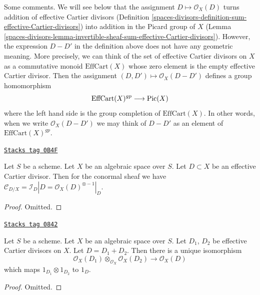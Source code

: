 Some comments. We will see below that the assignment
$D \mapsto \mathcal{O}_X(D)$ turns addition of effective Cartier
divisors (Definition \ref{spaces-divisors-definition-sum-effective-Cartier-divisors})
into addition in the Picard group of $X$
(Lemma \ref{spaces-divisors-lemma-invertible-sheaf-sum-effective-Cartier-divisors}).
However, the expression $D - D'$ in the definition above does not
have any geometric meaning. More precisely, we can think of the
set of effective Cartier divisors on $X$ as a commutative monoid
$\text{EffCart}(X)$ whose zero element is the empty effective Cartier divisor.
Then the assignment $(D, D') \mapsto \mathcal{O}_X(D - D')$ defines
a group homomorphism
$$
\text{EffCart}(X)^{gp} \longrightarrow \operatorname{Pic}(X)
$$
where the left hand side is the group completion of
$\text{EffCart}(X)$. In other words, when we write $\mathcal{O}_X(D - D')$
we may think of $D - D'$ as an element of $\text{EffCart}(X)^{gp}$.

\begin{lemma}
\label{spaces-divisors-lemma-conormal-effective-Cartier-divisor}
\href{https://stacks.math.columbia.edu/tag/0B4F}{\texttt{Stacks tag 0B4F}}

Let $S$ be a scheme. Let $X$ be an algebraic space over $S$.
Let $D \subset X$ be an effective Cartier divisor.
Then for the conormal sheaf we have $\mathcal{C}_{D/X} = \mathcal{I}_D|D =
\mathcal{O}_X(D)^{\otimes -1}|_D$.
\end{lemma}

\begin{proof}
Omitted.
\end{proof}

\begin{lemma}
\label{spaces-divisors-lemma-invertible-sheaf-sum-effective-Cartier-divisors}
\href{https://stacks.math.columbia.edu/tag/0842}{\texttt{Stacks tag 0842}}

Let $S$ be a scheme. Let $X$ be an algebraic space over $S$.
Let $D_1$, $D_2$ be effective Cartier divisors on $X$.
Let $D = D_1 + D_2$.
Then there is a unique isomorphism
$$
\mathcal{O}_X(D_1) \otimes_{\mathcal{O}_X} \mathcal{O}_X(D_2)
\longrightarrow
\mathcal{O}_X(D)
$$
which maps $1_{D_1} \otimes 1_{D_2}$ to $1_D$.
\end{lemma}

\begin{proof}
Omitted.
\end{proof}

